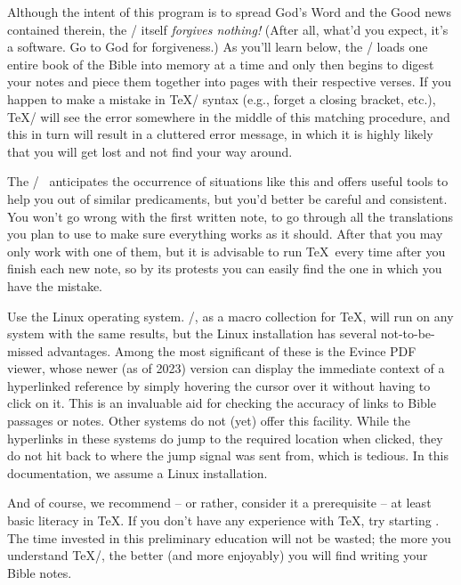 \watchout
Although the intent of this program is to spread God's Word and the Good news contained therein, the 
\OpBible/ itself {\it forgives nothing!} 
(After all, what'd you expect, it's a software. Go to God for forgiveness.) As you'll learn below, 
the \OpBible/ loads one entire book of the Bible into memory at a time and only then  
begins to digest your notes and piece them together into pages with their respective verses. If you 
happen to make a mistake in \TeX/ syntax (e.g., forget a closing bracket, etc.), \TeX/ will see the 
error somewhere in the middle of this matching procedure, and this in turn will result in a 
cluttered error message, in which it is highly likely that you will get lost and not find your way 
around.

The \OpBible/~ anticipates the occurrence of situations like this and offers useful tools to help 
you out of similar predicaments, but you'd better be careful and consistent. You won't go wrong with 
the first written note, to go through all the translations you plan to use to make sure everything 
works as it should.  After that you may only  work with one of them, but it is advisable to run 
\TeX\ every time  after you finish each new note, so by its protests  you can easily find the one 
in which you have the mistake.

\recommended Use the Linux operating system. \OpBible/, as a macro collection for \TeX, will run on any 
system with the same results, but the Linux installation has
several not-to-be-missed advantages. Among the most significant of these is the Evince PDF viewer, 
whose newer (as of 2023) version can display the immediate context of a hyperlinked
reference by simply hovering the cursor over it without having to click on it. This is an invaluable 
aid for checking the accuracy of links to Bible passages or notes.
Other systems do not (yet) offer this facility. While the hyperlinks in these systems do jump to the 
required location when clicked, they do not hit back to where the jump signal was sent from, which 
is tedious. In this documentation, we assume a Linux installation.

And of course, we recommend -- or rather, consider it a prerequisite -- at least basic literacy in 
\TeX.
If you don't have any experience with \TeX, try starting 
. 
The time invested in this preliminary education will not be wasted; the more you understand \TeX/, 
the better (and more enjoyably) you will find writing your Bible notes.


